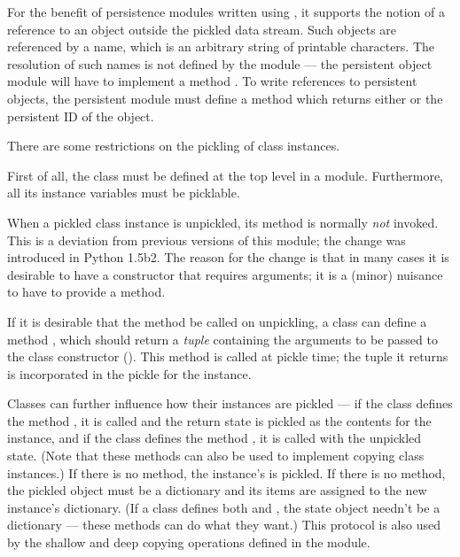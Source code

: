 For the benefit of persistence modules written using , it
supports the notion of a reference to an object outside the pickled
data stream.  Such objects are referenced by a name, which is an
arbitrary string of printable \ASCII{} characters.  The resolution of
such names is not defined by the  module --- the
persistent object module will have to implement a method
.  To write references to persistent objects,
the persistent module must define a method  which
returns either  or the persistent ID of the object.

There are some restrictions on the pickling of class instances.

First of all, the class must be defined at the top level in a module.
Furthermore, all its instance variables must be picklable.


When a pickled class instance is unpickled, its  method
is normally \emph{not} invoked.   This is a deviation
from previous versions of this module; the change was introduced in
Python 1.5b2.  The reason for the change is that in many cases it is
desirable to have a constructor that requires arguments; it is a
(minor) nuisance to have to provide a  method.

If it is desirable that the  method be called on
unpickling, a class can define a method ,
which should return a \emph{tuple} containing the arguments to be
passed to the class constructor ().  This method is
called at pickle time; the tuple it returns is incorporated in the
pickle for the instance.

Classes can further influence how their instances are pickled --- if
the class
defines the method , it is called and the return
state is pickled as the contents for the instance, and if the class
defines the method , it is called with the
unpickled state.  (Note that these methods can also be used to
implement copying class instances.)  If there is no
 method, the instance's  is
pickled.  If there is no  method, the pickled
object must be a dictionary and its items are assigned to the new
instance's dictionary.  (If a class defines both 
and , the state object needn't be a dictionary
--- these methods can do what they want.)  This protocol is also used
by the shallow and deep copying operations defined in the
 module.

